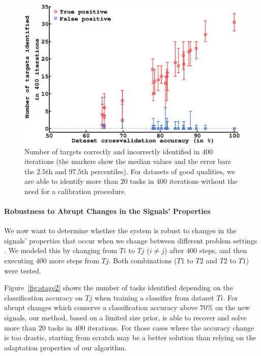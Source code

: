 \documentclass[letterpaper]{article}
\newcommand{\ww}{0.9}
\begin{document}
\begin{figure}[!ht]
    \centering
    \includegraphics[width=\ww\columnwidth]{img/plot_first400_reach} 
    \caption{Number of targets correctly and incorrectly identified in $400$ iterations (the markers show the median values and the error bars the $2.5$th and $97.5$th percentiles). For datasets of good qualities, we are able to identify more than $20$ tasks in $400$ iterations without the need for a calibration procedure.}
    \label{fig:avg_sum_400}
\end{figure} 

\paragraph{Robustness to Abrupt Changes in the Signals' Properties }
\label{CenterRobustnessToAbruptChangesInTheSignalsProperties}

We now want to determine whether the system is robust to changes in the signals' properties that occur when we change between different problem settings \cite{IturrateErrP13}. We modeled this by changing from $Ti$ to $Tj$ ($i \neq j$) after $400$ steps, and then executing $400$ more steps from $Tj$. Both combinations ($T1$ to $T2$ and $T2$ to $T1$) were tested.

Figure~\ref{fig:stage2} shows the number of tasks identified depending on the classification accuracy on $Tj$ when training a classifier from dataset $Ti$. For abrupt changes which conserve a classification accuracy above $70\%$ on the new signals, our method, based on a limited size prior, is able to recover and solve more than $20$ tasks in $400$ iterations. For those cases where the accuracy change is too drastic, starting from scratch may be a better solution than relying on the adaptation properties of our algorithm.
\end{document}
